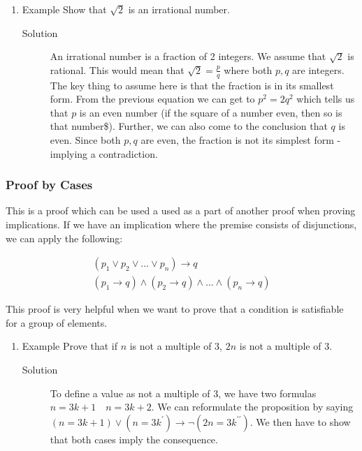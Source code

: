 \documentclass[11pt]{article}
\begin{document}
\begin{enumerate}
\item Example
\label{sec:org7dd3e83}
Show that \(\sqrt{2}\) is an irrational number.

\begin{description}
\item[{Solution}] An irrational number is a fraction of 2 integers. We assume that \(\sqrt{2}\) is rational. This would mean that \(\sqrt{2} = \frac{p}{q}\) where both \(p,q\) are integers. The key thing to assume here is that the fraction is in its smallest form. From the previous equation we can get to \(p^2 = 2q^2\) which tells us that \(p\) is an even number (if the square of a number even, then so is that number\$). Further, we can also come to the conclusion that \(q\) is even. Since both \(p,q\) are even, the fraction is not its simplest form - implying a contradiction.
\end{description}
\end{enumerate}
\subsubsection{Proof by Cases}
\label{sec:org65a3c1c}
This is a proof which can be used a used as a part of another proof when proving implications. If we have an implication where the premise consists of disjunctions, we can apply the following:

\begin{align}
(p_1 \lor p_2 \lor \ldots \lor p_n) \to q \\
(p_1 \to q) \land (p_2 \to q) \land \ldots \land (p_n \to q)
\end{align}

This proof is very helpful when we want to prove that a condition is satisfiable for a group of elements.

\begin{enumerate}
\item Example
\label{sec:org4042724}
Prove that if \(n\) is not a multiple of 3, \(2n\) is not a multiple of 3.
\begin{description}
\item[{Solution}] To define a value as not a multiple of 3, we have two formulas \(n = 3k + 1 \quad n = 3k + 2\). We can reformulate the proposition by saying \((n = 3k+1) \lor (n = 3k^\prime) \to \neg (2n = 3k^{\prime\prime})\). We then have to show that both cases imply the consequence.
\end{description}
\end{enumerate}
\end{document}
